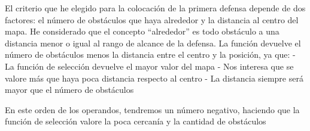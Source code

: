 El criterio que he elegido para la colocación de la primera defensa depende de dos factores: el número de obstáculos que haya alrededor y la distancia al centro del mapa. He considerado que el concepto ``alrededor'' es todo obstáculo a una distancia menor o igual al rango de alcance de la defensa.
La función devuelve el número de obstáculos menos la distancia entre el centro y la posición, ya que:
- La función de selección devuelve el mayor valor del mapa
- Nos interesa que se valore más que haya poca distancia respecto al centro
- La distancia siempre será mayor que el número de obstáculos

En este orden de los operandos, tendremos un número negativo, haciendo que la función de selección valore la poca cercanía y la cantidad de obstáculos

